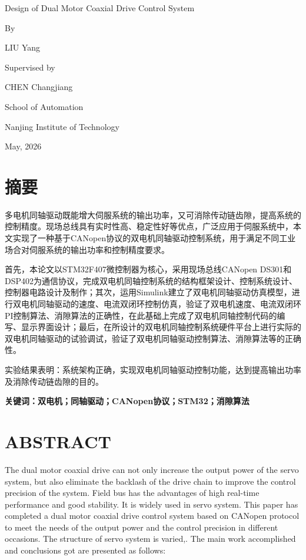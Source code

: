 \documentclass[UTF8,zihao=-4,openany,oneside]{ctexbook}
\begin{document}
Design of Dual Motor Coaxial Drive Control System

By

LIU Yang

Supervised by

CHEN Changjiang

School of Automation

Nanjing Institute of Technology

May, 2026

\chapter*{摘\quad 要}

多电机同轴驱动既能增大伺服系统的输出功率，又可消除传动链齿隙，提高系统的控制精度。现场总线具有实时性高、稳定性好等优点，广泛应用于伺服系统中，本文实现了一种基于CANopen协议的双电机同轴驱动控制系统，用于满足不同工业场合对伺服系统的输出功率和控制精度要求。

首先，本论文以STM32F407微控制器为核心，采用现场总线CANopen DS301和DSP402为通信协议，完成双电机同轴控制系统的结构框架设计、控制系统设计、控制器电路设计及制作；其次，运用Simulink建立了双电机同轴驱动仿真模型，进行双电机同轴驱动的速度、电流双闭环控制仿真，验证了双电机速度、电流双闭环PI控制算法、消隙算法的正确性，在此基础上完成了双电机同轴控制代码的编写、显示界面设计；最后，在所设计的双电机同轴控制系统硬件平台上进行实际的双电机同轴驱动的试验调试，验证了双电机同轴驱动控制算法、消隙算法等的正确性。

实验结果表明：系统架构正确，实现双电机同轴驱动控制功能，达到提高输出功率及消除传动链齿隙的目的。

\noindent\textbf{关键词：双电机；同轴驱动；CANopen协议；STM32；消隙算法}

\chapter*{ABSTRACT}

The dual motor coaxial drive can not only increase the output power of the servo system, but also eliminate the backlash of the drive chain to improve the control precision of the system. Field bus has the advantages of high real-time performance and good stability. It is widely used in servo system. This paper has completed a dual motor coaxial drive control system based on CANopen protocol to meet the needs of the output power and the control precision in different occasions. The structure of servo system is varied,. The main work accomplished and conclusions got are presented as follows:
\end{document}
